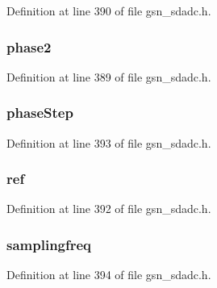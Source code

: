 Definition at line 390 of file gsn\_\-sdadc.h.

\hypertarget{a00213_a5473efc90b3e46bba821d8207bc33fbe}{
\subsubsection[{phase2}]{ {\bf phase2}}}
\label{a00213_a5473efc90b3e46bba821d8207bc33fbe}


Definition at line 389 of file gsn\_\-sdadc.h.

\hypertarget{a00213_a893016d6c414c37486cda1f0f7a9d3a4}{
\subsubsection[{phaseStep}]{ {\bf phaseStep}}}
\label{a00213_a893016d6c414c37486cda1f0f7a9d3a4}


Definition at line 393 of file gsn\_\-sdadc.h.

\hypertarget{a00213_a9ff4a6d9a5ba6de301e47626826b6068}{
\subsubsection[{ref}]{ {\bf ref}}}
\label{a00213_a9ff4a6d9a5ba6de301e47626826b6068}


Definition at line 392 of file gsn\_\-sdadc.h.

\hypertarget{a00213_a4ca9e91970ca83242fe92d354984831d}{
\subsubsection[{samplingfreq}]{ {\bf samplingfreq}}}
\label{a00213_a4ca9e91970ca83242fe92d354984831d}


Definition at line 394 of file gsn\_\-sdadc.h.

